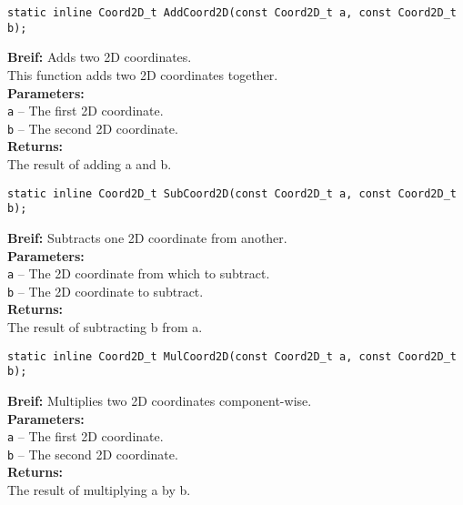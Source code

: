 \begin{verbatim}
static inline Coord2D_t AddCoord2D(const Coord2D_t a, const Coord2D_t b);
\end{verbatim}
\textbf{Breif:} Adds two 2D coordinates. \\
\hspace*{1cm}This function adds two 2D coordinates together. \\
\textbf{Parameters:} \\
\hspace*{1cm}\texttt{a} -- The first 2D coordinate. \\
\hspace*{1cm}\texttt{b} -- The second 2D coordinate. \\
\textbf{Returns:} \\
\hspace*{1cm}The result of adding a and b. \\[1em]

\begin{verbatim}
static inline Coord2D_t SubCoord2D(const Coord2D_t a, const Coord2D_t b);
\end{verbatim}
\textbf{Breif:} Subtracts one 2D coordinate from another. \\
\textbf{Parameters:} \\
\hspace*{1cm}\texttt{a} -- The 2D coordinate from which to subtract. \\
\hspace*{1cm}\texttt{b} -- The 2D coordinate to subtract. \\
\textbf{Returns:} \\
\hspace*{1cm}The result of subtracting b from a. \\[1em]

\begin{verbatim}
static inline Coord2D_t MulCoord2D(const Coord2D_t a, const Coord2D_t b);
\end{verbatim}
\textbf{Breif:} Multiplies two 2D coordinates component-wise. \\
\textbf{Parameters:} \\
\hspace*{1cm}\texttt{a} -- The first 2D coordinate. \\
\hspace*{1cm}\texttt{b} -- The second 2D coordinate. \\
\textbf{Returns:} \\
\hspace*{1cm}The result of multiplying a by b. \\[1em]

